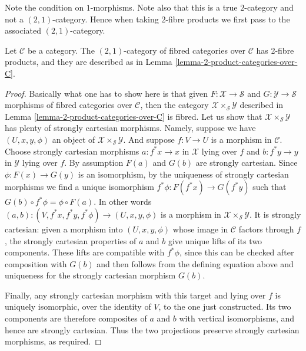 \noindent
Note the condition on $1$-morphisms.
Note also that this is a true $2$-category and
not a $(2, 1)$-category. Hence when taking $2$-fibre
products we first pass to the associated $(2, 1)$-category.

\begin{lemma}
\label{lemma-2-product-fibred-categories-over-C}
Let $\mathcal{C}$ be a category.
The $(2, 1)$-category of fibred categories
over $\mathcal{C}$ has 2-fibre products, and
they are described as in
Lemma \ref{lemma-2-product-categories-over-C}.
\end{lemma}

\begin{proof}
Basically what one has to show here is that given
$F : \mathcal{X} \to \mathcal{S}$ and
$G : \mathcal{Y} \to \mathcal{S}$ morphisms of fibred
categories over $\mathcal{C}$, then the category
$\mathcal{X} \times_\mathcal{S} \mathcal{Y}$
described in Lemma \ref{lemma-2-product-categories-over-C} is fibred.
Let us show that $\mathcal{X} \times_\mathcal{S} \mathcal{Y}$
has plenty of strongly cartesian morphisms.
Namely, suppose we have $(U, x, y, \phi)$ an object of
$\mathcal{X} \times_\mathcal{S} \mathcal{Y}$.
And suppose $f : V \to U$ is a morphism in $\mathcal{C}$.
Choose strongly cartesian morphisms $a : f^*x \to x$ in $\mathcal{X}$
lying over $f$ and $b : f^*y \to y$ in $\mathcal{Y}$ lying over $f$.
By assumption $F(a)$ and $G(b)$ are strongly cartesian.
Since $\phi : F(x) \to G(y)$ is an isomorphism, by the uniqueness
of strongly cartesian morphisms we find a unique isomorphism
$f^*\phi : F(f^*x) \to G(f^*y)$ such that
$G(b) \circ f^*\phi = \phi \circ F(a)$. In other words
$(a, b) : (V, f^*x, f^*y, f^*\phi) \to (U, x, y, \phi)$
is a morphism in $\mathcal{X} \times_\mathcal{S} \mathcal{Y}$.
It is strongly cartesian: given a morphism into $(U, x, y, \phi)$
whose image in $\mathcal{C}$ factors through $f$, the strongly cartesian
properties of $a$ and $b$ give unique lifts of its two components.  These
lifts are compatible with $f^*\phi$, since this can be checked after
composition with $G(b)$ and then follows from the defining equation above
and uniqueness for the strongly cartesian morphism $G(b)$.

Finally, any strongly cartesian morphism with this target and lying over
$f$ is uniquely isomorphic, over the identity of $V$, to the one just
constructed.  Its two components are therefore composites of $a$ and $b$
with vertical isomorphisms, and hence are strongly cartesian.  Thus the two
projections preserve strongly cartesian morphisms, as required.
\end{proof}

